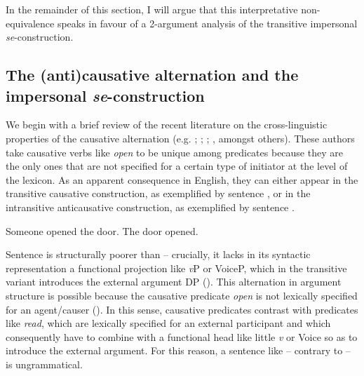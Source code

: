 \documentclass[output=paper,
modfonts,nonflat,
newtxmath
]{langsci/langscibook}
\begin{document}
\noindent In the remainder of this section, I will argue that this interpretative non-equivalence speaks in favour of a 2-argument analysis of the transitive impersonal \textit{se}-construction.

\subsection{The (anti)causative alternation and the impersonal \textit{se}-construction}

We begin with a brief review of the recent literature on the cross-linguistic properties of the causative alternation (e.g. \citealt{hovav1995}; \citealt{alexiadou2010}; \citealt{alexiadouet2015}; \citealt{schaffer2017}, amongst others). These authors take causative verbs like \textit{open} to be   unique among predicates because they are the only ones that are not specified for a certain type of initiator at the level of the lexicon. As an apparent consequence in English, they can either appear in the transitive causative construction, as exemplified by sentence , or in the intransitive anticausative construction, as exemplified by sentence .

\begin{exe}
\ex
\begin{xlist}
\ex \label{soop} Someone opened the door.
\ex \label{thdo} The door opened.
\end{xlist}
\end{exe}

\noindent Sentence  is structurally poorer than  -- crucially, it lacks in its syntactic representation a functional projection like \textit{v}P or VoiceP, which in the transitive variant  introduces the external argument DP (\citealt{kratzer1996}).  This alternation in argument structure is possible because the causative predicate \textit{open} is not lexically specified for an agent/causer (\citealt{alexiadouet2015}). In this sense, causative predicates contrast with predicates like \textit{read}, which are lexically specified for an external participant and which consequently have to combine with a functional head like little \textit{v} or Voice so as to introduce the external argument. For this reason, a sentence like  -- contrary to  -- is ungrammatical. \par

\begin{exe}
 \label{thbo}
\end{exe}
\end{document}
